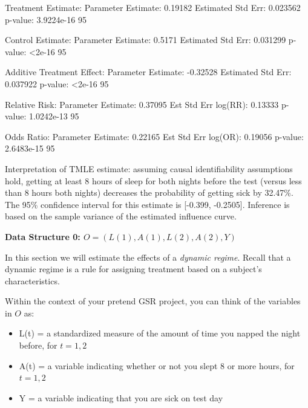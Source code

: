 \documentclass[answers]{exam}
\begin{document}
\begin{solution}
\begin{Schunk}
\begin{Soutput}
Treatment Estimate:
   Parameter Estimate:  0.19182 
    Estimated Std Err:  0.023562 
              p-value:  3.9224e-16 
    95%

Control Estimate:
   Parameter Estimate:  0.5171 
    Estimated Std Err:  0.031299 
              p-value:  <2e-16 
    95%

Additive Treatment Effect:
   Parameter Estimate:  -0.32528 
    Estimated Std Err:  0.037922 
              p-value:  <2e-16 
    95%

Relative Risk:
   Parameter Estimate:  0.37095 
  Est Std Err log(RR):  0.13333 
              p-value:  1.0242e-13 
    95%

Odds Ratio:
   Parameter Estimate:  0.22165 
  Est Std Err log(OR):  0.19056 
              p-value:  2.6483e-15 
    95%
\end{Soutput}
\end{Schunk}

Interpretation of TMLE estimate: assuming causal identifiability assumptions hold, getting at least 8 hours of sleep for both nights before the test (versus less than 8 hours both nights) decreases the probability of getting sick by 32.47\%. The 95\% confidence interval for this estimate is [-0.399, -0.2505]. Inference is based on the sample variance of the estimated influence curve. 

\end{solution}

\noindent\large\textbf{Data Structure 0: $O = (L(1), A(1), L(2), A(2), Y)$}
\normalsize

\noindent In this section we will estimate the effects of a \textit{dynamic regime}. Recall that a dynamic regime is a rule for assigning treatment based on a subject's characteristics. 

Within the context of your pretend GSR project, you can think of the variables in $O$ as:
\begin{itemize}
\item L(t) = a standardized measure of the amount of time you napped the night before, for $t = 1,2$
\item A(t) = a variable indicating whether or not you slept 8 or more hours, for $t = 1,2$
\item Y = a variable indicating that you are sick on test day 
\end{itemize}
\end{document}
